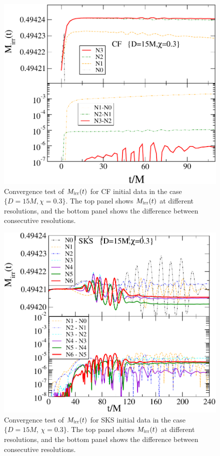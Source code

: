 \begin{figure}
 \includegraphics[scale=0.95]{chap5/CFMConvergence1}
  \caption[Convergence of $M_{\rm irr})(t)$ for CF initial
  data.]{Convergence test of $M_{\rm irr}(t)$ for CF initial data in the
  case $\{D=15M,\chi=0.3\}$. The top panel shows $M_{\rm irr}(t)$ at
  different resolutions, and the bottom panel shows the difference
  between consecutive resolutions.}
  \label{fig:CFMConvergence1}
\end{figure}

\begin{figure}[!htbp]
 \includegraphics[scale=0.95]{chap5/SKSMConvergence1}
  \caption[Convergence of $M_{\rm irr})(t)$ for SKS initial
  data.]{Convergence test of $M_{\rm irr}(t)$ for SKS initial data in the
  case $\{D=15M$, $\chi=0.3\}$. The top panel shows $M_{\rm irr}(t)$ at
  different resolutions, and the bottom panel shows the difference
  between consecutive resolutions.}

  \label{fig:SKSMConvergence1}
\end{figure}

